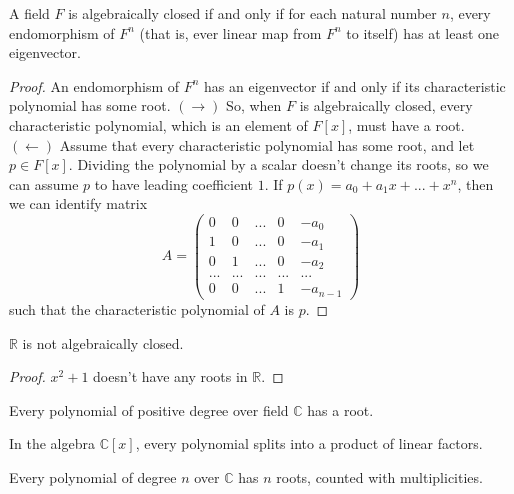 \documentclass{article}
\begin{document}
      \begin{proposition}
        A field $F$ is algebraically closed if and only if for each natural number $n$, every endomorphism of $F^n$ (that is, ever linear map from $F^n$ to itself) has at least one eigenvector. 
      \end{proposition}
      \begin{proof}
        An endomorphism of $F^n$ has an eigenvector if and only if its characteristic polynomial has some root. $(\rightarrow)$ So, when $F$ is algebraically closed, every characteristic polynomial, which is an element of $F[x]$, must have a root. $(\leftarrow)$ Assume that every characteristic polynomial has some root, and let $p \in F[x]$. Dividing the polynomial by a scalar doesn't change its roots, so we can assume $p$ to have leading coefficient $1$. If $p(x) = a_0 + a_1 x + ... + x^n$, then we can identify matrix 
        \[A = \begin{pmatrix}
        0 & 0 & ... & 0 & -a_0 \\
        1 & 0 & ... & 0 & -a_1 \\
        0 & 1 & ... & 0 & -a_2 \\
        ... & ... & ... & ... & ... \\
        0 & 0 & ... & 1 & -a_{n-1}
        \end{pmatrix}\]
        such that the characteristic polynomial of $A$ is $p$. 
      \end{proof}

      \begin{proposition}
        $\mathbb{R}$ is not algebraically closed. 
      \end{proposition}
      \begin{proof}
        $x^2 + 1$ doesn't have any roots in $\mathbb{R}$. 
      \end{proof}

      \begin{theorem}
        Every polynomial of positive degree over field $\mathbb{C}$ has a root. 
      \end{theorem}

      \begin{corollary}
        In the algebra $\mathbb{C}[x]$, every polynomial splits into a product of linear factors. 
      \end{corollary}

      \begin{corollary}
        Every polynomial of degree $n$ over $\mathbb{C}$ has $n$ roots, counted with multiplicities. 
      \end{corollary}
\end{document}
